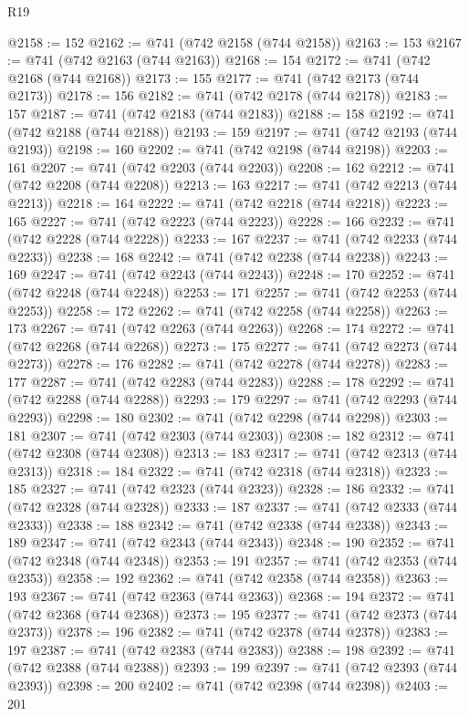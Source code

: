 \begin{lexlean}{R19}
\begin{coremodule}
@2158 := 152
@2162 := @741 (@742 @2158 (@744 @2158))
@2163 := 153
@2167 := @741 (@742 @2163 (@744 @2163))
@2168 := 154
@2172 := @741 (@742 @2168 (@744 @2168))
@2173 := 155
@2177 := @741 (@742 @2173 (@744 @2173))
@2178 := 156
@2182 := @741 (@742 @2178 (@744 @2178))
@2183 := 157
@2187 := @741 (@742 @2183 (@744 @2183))
@2188 := 158
@2192 := @741 (@742 @2188 (@744 @2188))
@2193 := 159
@2197 := @741 (@742 @2193 (@744 @2193))
@2198 := 160
@2202 := @741 (@742 @2198 (@744 @2198))
@2203 := 161
@2207 := @741 (@742 @2203 (@744 @2203))
@2208 := 162
@2212 := @741 (@742 @2208 (@744 @2208))
@2213 := 163
@2217 := @741 (@742 @2213 (@744 @2213))
@2218 := 164
@2222 := @741 (@742 @2218 (@744 @2218))
@2223 := 165
@2227 := @741 (@742 @2223 (@744 @2223))
@2228 := 166
@2232 := @741 (@742 @2228 (@744 @2228))
@2233 := 167
@2237 := @741 (@742 @2233 (@744 @2233))
@2238 := 168
@2242 := @741 (@742 @2238 (@744 @2238))
@2243 := 169
@2247 := @741 (@742 @2243 (@744 @2243))
@2248 := 170
@2252 := @741 (@742 @2248 (@744 @2248))
@2253 := 171
@2257 := @741 (@742 @2253 (@744 @2253))
@2258 := 172
@2262 := @741 (@742 @2258 (@744 @2258))
@2263 := 173
@2267 := @741 (@742 @2263 (@744 @2263))
@2268 := 174
@2272 := @741 (@742 @2268 (@744 @2268))
@2273 := 175
@2277 := @741 (@742 @2273 (@744 @2273))
@2278 := 176
@2282 := @741 (@742 @2278 (@744 @2278))
@2283 := 177
@2287 := @741 (@742 @2283 (@744 @2283))
@2288 := 178
@2292 := @741 (@742 @2288 (@744 @2288))
@2293 := 179
@2297 := @741 (@742 @2293 (@744 @2293))
@2298 := 180
@2302 := @741 (@742 @2298 (@744 @2298))
@2303 := 181
@2307 := @741 (@742 @2303 (@744 @2303))
@2308 := 182
@2312 := @741 (@742 @2308 (@744 @2308))
@2313 := 183
@2317 := @741 (@742 @2313 (@744 @2313))
@2318 := 184
@2322 := @741 (@742 @2318 (@744 @2318))
@2323 := 185
@2327 := @741 (@742 @2323 (@744 @2323))
@2328 := 186
@2332 := @741 (@742 @2328 (@744 @2328))
@2333 := 187
@2337 := @741 (@742 @2333 (@744 @2333))
@2338 := 188
@2342 := @741 (@742 @2338 (@744 @2338))
@2343 := 189
@2347 := @741 (@742 @2343 (@744 @2343))
@2348 := 190
@2352 := @741 (@742 @2348 (@744 @2348))
@2353 := 191
@2357 := @741 (@742 @2353 (@744 @2353))
@2358 := 192
@2362 := @741 (@742 @2358 (@744 @2358))
@2363 := 193
@2367 := @741 (@742 @2363 (@744 @2363))
@2368 := 194
@2372 := @741 (@742 @2368 (@744 @2368))
@2373 := 195
@2377 := @741 (@742 @2373 (@744 @2373))
@2378 := 196
@2382 := @741 (@742 @2378 (@744 @2378))
@2383 := 197
@2387 := @741 (@742 @2383 (@744 @2383))
@2388 := 198
@2392 := @741 (@742 @2388 (@744 @2388))
@2393 := 199
@2397 := @741 (@742 @2393 (@744 @2393))
@2398 := 200
@2402 := @741 (@742 @2398 (@744 @2398))
@2403 := 201

\end{coremodule}
\end{lexlean}
